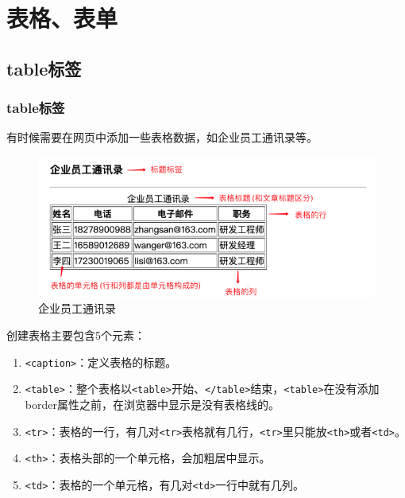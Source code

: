 \chapter{表格、表单}

\section{table标签}

\subsection{table标签}

有时候需要在网页中添加一些表格数据，如企业员工通讯录等。

\begin{figure}[H]
    \centering
    \includegraphics[scale=0.9]{img/C4/4-1/1.png}
    \caption{企业员工通讯录}
\end{figure}

创建表格主要包含5个元素：

\begin{enumerate}
    \item \lstinline|<caption>|：定义表格的标题。

    \item \lstinline|<table>|：整个表格以\lstinline|<table>|开始、\lstinline|</table>|结束，\lstinline|<table>|在没有添加border属性之前，在浏览器中显示是没有表格线的。

    \item \lstinline|<tr>|：表格的一行，有几对\lstinline|<tr>|表格就有几行，\lstinline|<tr>|里只能放\lstinline|<th>|或者\lstinline|<td>|。

    \item \lstinline|<th>|：表格头部的一个单元格，会加粗居中显示。

    \item \lstinline|<td>|：表格的一个单元格，有几对\lstinline|<td>|一行中就有几列。
\end{enumerate}

